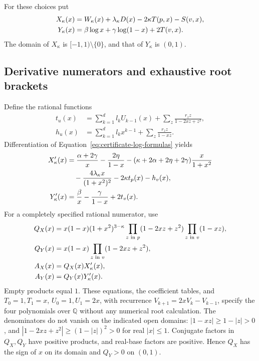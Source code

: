 For these choices put
\begin{align}
 X_\kappa(x)&=W_\kappa(x)+\lambda_\kappa D(x)
                         -2\kappa T(p,x)-S(v,x),\notag\\
 Y_\kappa(x)&=\beta\log x+\gamma\log(1-x)+2T(v,x).
 \label{eq:certificate-barriers}
\end{align}
The domain of $X_\kappa$ is $[-1,1)\setminus\{0\}$, and that of
$Y_\kappa$ is $(0,1)$.

\subsection{Derivative numerators and exhaustive root brackets}
Define the rational functions
\begin{align*}
 t_u(x)&=\sum_{k=1}^dl_kU_{k-1}(x)
               +\sum_z\frac{r_zz}{1-2xz+z^2},\\
 h_u(x)&=\sum_{k=1}^dl_kx^{k-1}
               +\sum_z\frac{r_zz}{1-xz}.
\end{align*}
Differentiation of Equation~\eqref{eq:certificate-log-formulas} yields
\begin{align}
 X_\kappa'(x)
 &=\frac{\alpha+2\gamma}{x}-\frac{2\eta}{1-x}
 -(\kappa+2\alpha+2\eta+2\gamma)\frac{x}{1+x^2}
 \notag\\
 &\quad-\frac{4\lambda_\kappa x}{(1+x^2)^2}
 -2\kappa t_p(x)-h_v(x),\notag\\
 Y_\kappa'(x)&=\frac\beta x-\frac\gamma{1-x}+2t_v(x).
 \label{eq:certificate-derivatives}
\end{align}
For a completely specified rational numerator, use
\begin{align}
 Q_X(x)&=x(1-x)(1+x^2)^{3-\kappa}
       \prod_{z\text{ in }p}(1-2xz+z^2)
       \prod_{z\text{ in }v}(1-xz),\notag\\
 Q_Y(x)&=x(1-x)\prod_{z\text{ in }v}(1-2xz+z^2),\notag\\
 A_X(x)&=Q_X(x)X_\kappa'(x),\notag\\
 A_Y(x)&=Q_Y(x)Y_\kappa'(x).
 \label{eq:certificate-numerators}
\end{align}
Empty products equal $1$.  These equations, the coefficient tables, and
$T_0=1,T_1=x$, $U_0=1,U_1=2x$, with recurrence
$V_{k+1}=2xV_k-V_{k-1}$, specify the four polynomials over $\mathbb Q$
without any numerical root calculation.
The denominators do not vanish on the indicated open domains:
$|1-xz|\ge1-|z|>0$, and
$|1-2xz+z^2|\ge(1-|z|)^2>0$ for real $|x|\le1$.
Conjugate factors in $Q_X,Q_Y$ have positive products, and real-base
factors are positive.  Hence $Q_X$ has the sign of $x$ on its domain and
$Q_Y>0$ on $(0,1)$.

